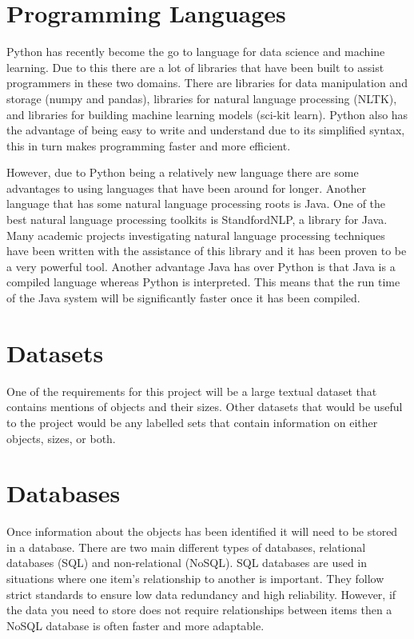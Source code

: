 \documentclass[11pt,oneside]{book}
\begin{document}
\section{Programming Languages}
Python has recently become the go to language for data science and machine learning. Due to this there are a lot of libraries that have been built to assist programmers in these two domains. There are libraries for data manipulation and storage (numpy and pandas), libraries for natural language processing (NLTK), and libraries for building machine learning models (sci-kit learn). Python also has the advantage of being easy to write and understand due to its simplified syntax, this in turn makes programming faster and more efficient.

However, due to Python being a relatively new language there are some advantages to using languages that have been around for longer. Another language that has some natural language processing roots is Java. One of the best natural language processing toolkits is StandfordNLP, a library for Java. Many academic projects investigating natural language processing techniques have been written with the assistance of this library and it has been proven to be a very powerful tool. Another advantage Java has over Python is that Java is a compiled language whereas Python is interpreted. This means that the run time of the Java system will be significantly faster once it has been compiled.

\section{Datasets}

One of the requirements for this project will be a large textual dataset that contains mentions of objects and their sizes. Other datasets that would be useful to the project would be any labelled sets that contain information on either objects, sizes, or both.

\section{Databases}

Once information about the objects has been identified it will need to be stored in a database. There are two main different types of databases, relational databases (SQL) and non-relational (NoSQL). SQL databases are used in situations where one item's relationship to another is important. They follow strict standards to ensure low data redundancy and high reliability. However, if the data you need to store does not require relationships between items then a NoSQL database is often faster and more adaptable. 
\end{document}
